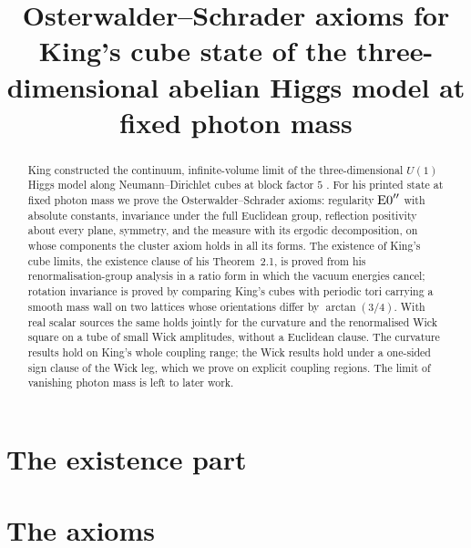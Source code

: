 


\title[OS axioms for King's cube state at fixed photon mass]{Osterwalder--Schrader axioms for King's cube state of the three-dimensional abelian Higgs model at fixed photon mass}
\author{}
\date{}



\begin{abstract}
King constructed the continuum, infinite-volume limit of the three-dimensional $U(1)$ Higgs model along Neumann--Dirichlet cubes at block factor $5$ \cite{K1,K2}. For his printed state at fixed photon mass we prove the Osterwalder--Schrader axioms: regularity $\mathrm{E0}''$ with absolute constants, invariance under the full Euclidean group, reflection positivity about every plane, symmetry, and the measure with its ergodic decomposition, on whose components the cluster axiom holds in all its forms. The existence of King's cube limits, the existence clause of his Theorem~2.1, is proved from his renormalisation-group analysis in a ratio form in which the vacuum energies cancel; rotation invariance is proved by comparing King's cubes with periodic tori carrying a smooth mass wall on two lattices whose orientations differ by $\arctan(3/4)$. With real scalar sources the same holds jointly for the curvature and the renormalised Wick square on a tube of small Wick amplitudes, without a Euclidean clause. The curvature results hold on King's whole coupling range; the Wick results hold under a one-sided sign clause of the Wick leg, which we prove on explicit coupling regions. The limit of vanishing photon mass is left to later work.
\end{abstract}

\maketitle






\part*{The existence part}


\part*{The axioms}









